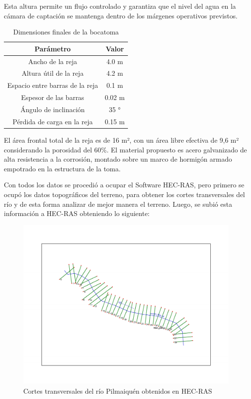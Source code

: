 \documentclass{article} %
\begin{document}
Esta altura permite un flujo controlado y garantiza que el nivel del agua en la cámara de captación se mantenga dentro de los márgenes operativos previstos.

\begin{table}
    \centering
    \begin{tabular}{c c}
        \textbf{Parámetro} & \textbf{Valor} \\
        \hline
        Ancho de la reja & 4.0 m \\
        Altura útil de la reja & 4.2 m \\ 
        Espacio entre barras de la reja & 0.1 m \\
        Espesor de las barras & 0.02 m \\
        Ángulo de inclinación & 35 ° \\
        Pérdida de carga en la reja & 0.15 m \\ \hline
    \end{tabular}
    \caption{Dimensiones finales de la bocatoma}
\end{table}

El área frontal total de la reja es de 16 m², con un área libre efectiva de 9,6 m² considerando la porosidad del 60\%.
El material propuesto es acero galvanizado de alta resistencia a la corrosión, montado sobre un marco de hormigón armado empotrado en la estructura de la toma.




Con todos los datos se procedió a ocupar el Software HEC-RAS, pero primero se ocupó los datos topográficos del terreno, para obtener los cortes transversales del río y de esta forma analizar de mejor manera el terreno. Luego, se subió esta información a HEC-RAS obteniendo lo siguiente:
\begin{figure}[h!]
    \centering
    \includegraphics[width=0.6\linewidth]{imagenes/rio_sin_estruc.pdf}
    \caption{Cortes transversales del río Pilmaiquén obtenidos en HEC-RAS}
\end{figure}
\end{document}
